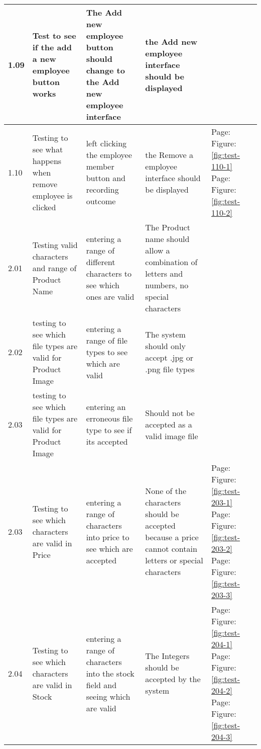 \begin{flushleft}
\begin{longtable}{|p{1cm}|p{2.5cm}|p{2.5cm}|p{2cm}|p{2cm}|}
	1.09 & Test to see if the add a new employee button works & The Add new employee button should change to the Add new employee interface &  the Add new employee interface should be displayed& \\ \hline
	1.10 & Testing to see what happens when remove employee is clicked & left clicking the employee member button and recording outcome & the Remove a employee interface should be displayed &  Page: \pageref{fig:test-110-1} \newline Figure: \ref{fig:test-110-1} \newline \newline Page: \pageref{fig:test-110-2} \newline Figure: \ref{fig:test-110-2} \newline \newline\\ \hline
	2.01 & Testing valid characters and range of Product Name & entering a range of different characters to see which ones are valid & The Product name should allow a combination of letters and numbers, no special characters & \\ \hline
	2.02 & testing to see which file types are valid for Product Image & entering a range of file types to see which are valid & The system should only accept .jpg or .png file types & \\ \hline
	\rowcolor{dark-grey}2.03 & testing to see which file types are valid for Product Image & entering an erroneous file type to see if its accepted &  Should not be accepted as a valid image file & \\ \hline
	2.03 & Testing to see which characters are valid in Price & entering a range of characters into price to see which are accepted &  None of the characters should be accepted because a price cannot contain letters or special characters &  Page: \pageref{fig:test-203-1} \newline Figure: \ref{fig:test-203-1} \newline \newline  Page: \pageref{fig:test-203-2} \newline Figure: \ref{fig:test-203-2} \newline \newline Page: \pageref{fig:test-203-3} \newline Figure: \ref{fig:test-203-3}\\ \hline
	2.04 & Testing to see which characters are valid in Stock & entering a range of characters into the stock field and seeing which are valid  & The Integers should be accepted by the system &   Page: \pageref{fig:test-204-1} \newline Figure: \ref{fig:test-204-1} \newline \newline  Page: \pageref{fig:test-204-2} \newline Figure: \ref{fig:test-204-2} \newline \newline Page: \pageref{fig:test-204-3} \newline Figure: \ref{fig:test-204-3} \\ \hline

\end{longtable}
\end{flushleft}
